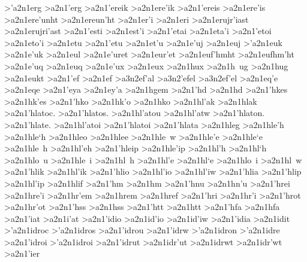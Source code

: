 {>'a2n1erg   		%
>a2n1'erg
>a2n1'ereik 		%
>a2n1ere'ik
>a2n1'ereis 		%
>a2n1ere'is
>a2n1ere'unht 		%
>a2n1ereun'ht
>a2n1er'i   		%
>a2n1eri
>a2n1erujr'iast   	%
>a2n1erujri'ast
>a2n1'esti  		%
>a2n1est'i
>a2n1'etai  		%
>a2n1eta'i
>a2n1'etoi  		%
>a2n1eto'i
>a2n1etu    		%
>a2n1'etu  		%
>a2n1et'u
>a2n1e'uj   		%
>a2n1euj
>'a2n1euk   		%
>a2n1e'uk
>a2n1eul    		%
>a2n1e'uret 		%
>a2n1eur'et
>a2n1euf'hmht 		%
>a2n1eufhm'ht
 >a2n1e'uq   		%
 >a2n1euq
 >a2n1e'ux  		%
 >a2n1eux
 >a2n1hux  		%
 >a2n1h~ug		%
 >a2n1hug
 >a2n1eukt		%
>a2n1'ef    		%
>a2n1ef
	>a3n2ef'al  	%
	>a3n2'efel  	%
	>a3n2ef'el
>a2n1eq'e   		%
>a2n1eqe
>a2n1'eya   		%
>a2n1ey'a
>a2n1hgem   		%
>a2n1'hd    		%
>a2n1hd
>a2n1'hkes    		%
>a2n1hk'es
>a2n1'hko		%
>a2n1hk'o
>a2n1hko
>a2n1hl'ak    		%
>a2n1hlak
>a2n1'hlatoc. 		%
>a2n1'hlatos.
>a2n1hl'atou
>a2n1hl'atw
>a2n1'hlaton.
>a2n1'hlate.
>a2n1hl'atoi
>a2n1'hlatoi
>a2n1'hlata
>a2n1hleg		%
>a2n1hle'h    		%
>a2n1hle`h
>a2n1hleo
>a2n1hlee
>a2n1hle~w
>a2n1hle'e
>a2n1hle`e
>a2n1hle~h
>a2n1hl'eh  	 	%
>a2n1'hleip		%
>a2n1hle'ip
>a2n1hl'h		%
>a2n1hl`h
>a2n1hlo~u
>a2n1hle~i
>a2n1hl~h
>a2n1hl'e
>a2n1hl`e
>a2n1hlo~i
>a2n1hl~w
>a2n1'hlik		%
>a2n1hl'ik
>a2n1'hlio 		%
>a2n1hl'io
>a2n1hl'iw
>a2n1'hlia
>a2n1'hlip		%
>a2n1hl'ip
>a2n1hlif    		%
>a2n1'hm    		%
>a2n1hm
>a2n1'hnu   		%
>a2n1hn'u
>a2n1'hrei  		%
>a2n1hre'i
>a2n1hr'em  		%
>a2n1hrem
>a2n1href   		%
>a2n1'hri   		%
>a2n1hr'i
>a2n1'hrot  		%
>a2n1hr'ot
>a2n1'hss   		%
>a2n1hss
>a2n1'htt   		%
>a2n1htt
>a2n1'hfa  		%
>a2n1hfa
>a2n1'iat   		%
>a2n1i'at
>a2n1'idio    		%
>a2n1id'io
>a2n1id'iw
>a2n1'idia
>a2n1idit    		%
>'a2n1idroc 		%
>'a2n1idros
>a2n1'idrou
>a2n1'idrw
>'a2n1idron
>'a2n1idre
>a2n1'idroi
>'a2n1idroi
>a2n1'idrut		%
>a2n1idr'ut
>a2n1idrwt		%
>a2n1idr'wt   	 	%
>a2n1'ier   		%
}
